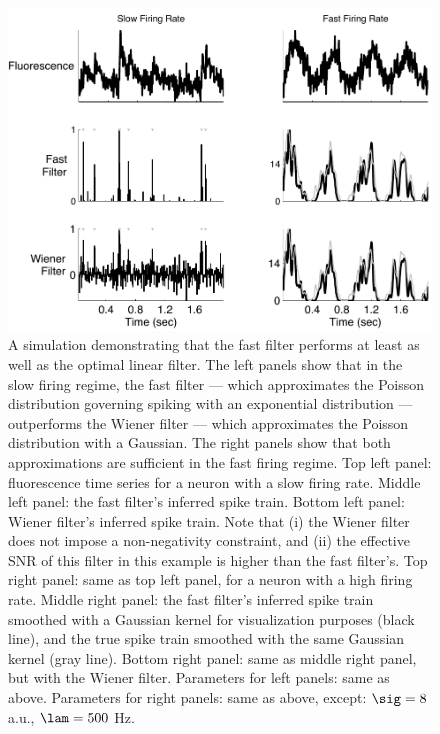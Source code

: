\begin{figure}
\centering \includegraphics[width=.9\linewidth]{wiener}
\caption{A simulation demonstrating that the fast filter performs at least as well as the optimal linear filter. The left panels show that in the slow firing  regime, the fast filter --- which approximates the Poisson distribution governing spiking with an exponential distribution  --- outperforms the Wiener filter --- which approximates the Poisson distribution with a Gaussian.  The right panels show that both approximations are sufficient in the fast firing regime. Top left panel: fluorescence time series for a neuron with a slow firing rate.  Middle left panel: the fast filter's inferred spike train.  Bottom left panel: Wiener filter's inferred spike train.  Note that (i) the Wiener filter does not impose a non-negativity constraint, and (ii) the effective SNR of this filter in this example is higher than the fast filter's.  Top right panel: same as top left panel, for a neuron with a high firing rate.  Middle right panel: the fast filter's inferred spike train smoothed with a Gaussian kernel for visualization purposes (black line), and the true spike train smoothed with the same Gaussian kernel (gray line).  Bottom right panel: same as middle right panel, but with the Wiener filter. Parameters for left panels: same as above.  Parameters for right panels: same as above, except: $\sig=8$ a.u., $\lam=500$ Hz.} \label{fig:wiener}
\end{figure}

